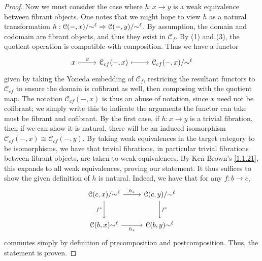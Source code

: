\begin{proof}
	Now we must consider the case where $h : x \to y$ is a weak equivalence between fibrant objects. One notes that we might hope to view $h$ as a natural transformation $h : \mathcal{C} (-,x) / \mathbin{\sim}^\ell  \Rightarrow \mathcal{C} (-,y) /\mathbin{\sim}^\ell $. By assumption, the domain and codomain are fibrant objects, and thus they exist in $\mathcal{C} _f$. By (1) and (3), the quotient operation is compatible with composition. Thus we have a functor
	\[\begin{tikzcd}[row sep = 2.5em, column sep = 2.5em]
		x \ar[" y ", mapsto, r]  & \mathcal{C}_{cf}(-,x) \ar[mapsto, r]  & \mathcal{C}_{cf}(-,x) / \tildesim^\ell 
	\end{tikzcd}\]
	given by taking the Yoneda embedding of $\mathcal{C} _f$, restricing the resultant functors to $\mathcal{C} _{cf} $ to ensure the domain is cofibrant as well, then composing with the quotient map. The notation $\mathcal{C} _{cf} (-,x)$ is thus an abuse of notation, since $x$ need not be cofibrant; we simply write this to indicate the arguments the functor can take must be fibrant and cofibrant. By the first case, if $h : x \to y$ is a trivial fibration, then if we can show it is natural, there will be an induced isomorphism $\mathcal{C}_{cf} (-,x)\cong \mathcal{C} _{cf} (-,y)$. By taking weak equivalences in the target category to be isomorphisms, we have that trivial fibrations, in particular trivial fibrations between fibrant objects, are taken to weak equivalences. By Ken Brown's \cref{1.1.21}, this expands to all weak equivalences, proving our statement. It thus suffices to show the given definition of $h$ is natural. Indeed, we have that for any $f : b \to c$,
	\[\begin{tikzcd}[row sep = 2.5em, column sep = 2.5em]
	\mathcal{C} (c,x) / \tildesim^\ell \ar[" h_* ", r] \ar[" f^* "', d]  & \mathcal{C} (c,y) / \tildesim^\ell \ar[" f^* ", d]  \\
	\mathcal{C} (b,x)\tildesim^\ell \ar[" h_* "', r]  & \mathcal{C} (b,y)\tildesim^\ell 
	\end{tikzcd}\]
	commutes simply by definition of precomposition and postcomposition. Thus, the statement is proven.


\end{proof}
